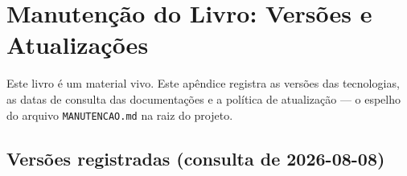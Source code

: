 \chapter{Manutenção do Livro: Versões e Atualizações}
\label{apendice:manutencao}

Este livro é um material vivo. Este apêndice registra as versões das
tecnologias, as datas de consulta das documentações e a política de
atualização — o espelho do arquivo \texttt{MANUTENCAO.md} na raiz do projeto.

\section{Versões registradas (consulta de 2026-08-08)}

